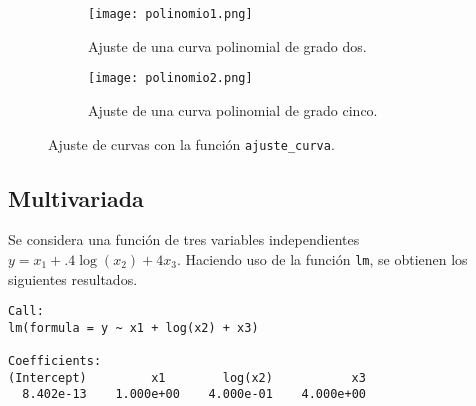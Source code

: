 \documentclass[12pt,letterpaper]{article}
\begin{document}
\begin{figure}
 	\centering 
 	\begin{subfigure}[b]{0.45\linewidth}
 		\texttt{[image: polinomio1.png]} 		
 		\caption{Ajuste de una curva polinomial de grado dos.}
 		 		\label{polinomio1}
 	\end{subfigure} \quad 
 	\begin{subfigure}[b]{0.45\linewidth}
 		\texttt{[image: polinomio2.png]} 		
 		\caption{Ajuste de una curva polinomial de grado cinco.}
 		\label{polinomio2}
 	\end{subfigure}

 	 	\caption{Ajuste de curvas con la función \texttt{ajuste\_curva}.} 
 	 		\label{polinomios}
\end{figure}

\subsection{Multivariada}
Se considera una función de tres variables independientes $y = x_1 + .4\log(x_2) + 4x_3$. Haciendo uso de la función \texttt{lm}, se obtienen los siguientes resultados. 
\begin{verbatim}
Call:
lm(formula = y ~ x1 + log(x2) + x3)

Coefficients:
(Intercept)         x1        log(x2)           x3  
  8.402e-13    1.000e+00    4.000e-01    4.000e+00 
\end{verbatim}

 

\end{document}
